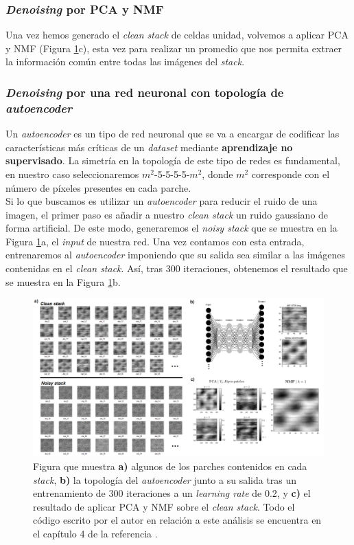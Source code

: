 \subsubsection{\textit{Denoising} por PCA y NMF}

Una vez hemos generado el \textit{clean stack} de celdas unidad, volvemos a aplicar PCA y NMF (Figura \ref{fig:17}c), esta vez para realizar un promedio que nos permita extraer la información común entre todas las imágenes del \textit{stack}.

\subsubsection{\textit{Denoising} por una red neuronal con topología de \textit{autoencoder}}

Un \textit{autoencoder} es un tipo de red neuronal que se va a encargar de codificar las características más críticas de un \textit{dataset} mediante \textbf{aprendizaje no supervisado}. La simetría en la topología de este tipo de redes es fundamental, en nuestro caso seleccionaremos $m^2$-5-5-5-5-$m^2$, donde $m^2$ corresponde con el número de píxeles presentes en cada parche.\\

Si lo que buscamos es utilizar un \textit{autoencoder} para reducir el ruido de una imagen, el primer paso es añadir a nuestro \textit{clean stack} un ruido gaussiano de forma artificial. De este modo, generaremos el \textit{noisy stack} que se muestra en la Figura \ref{fig:17}a, el \textit{input} de nuestra red. Una vez contamos con esta entrada, entrenaremos al \textit{autoencoder} imponiendo que su salida sea similar a las imágenes contenidas en el \textit{clean stack}. Así, tras 300 iteraciones, obtenemos el resultado que se muestra en la Figura \ref{fig:17}b.

\newpage
\begin{figure}[h!]
    \centering
    \includegraphics[width=1\textwidth]{fig/Fig17.png}
    \caption{ Figura que muestra \textbf{a)} algunos de los parches contenidos en cada \textit{stack}, \textbf{b)} la topología del \textit{autoencoder} junto a su salida tras un entrenamiento de 300 iteraciones a un \textit{learning rate} de 0.2, y \textbf{c)} el resultado de aplicar PCA y NMF sobre el \textit{clean stack}. Todo el código escrito por el autor en relación a este análisis se encuentra en el capítulo 4 de la referencia \cite{repo}.}
    \label{fig:17}
\end{figure}

